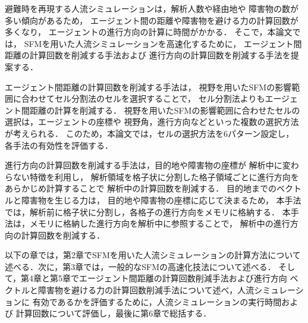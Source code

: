 避難時を再現する人流シミュレーションは，解析人数や経由地や
障害物の数が多い傾向があるため，
エージェント間の距離や障害物を避ける力の計算回数が多くなり，
エージェントの進行方向の計算に時間がかかる．
そこで，本論文では，
SFMを用いた人流シミュレーションを高速化するために，
エージェント間距離の計算回数を削減する手法および
進行方向の計算回数を削減する手法を提案する．

エージェント間距離の計算回数を削減する手法は，
視野を用いたSFMの影響範囲に合わせてセル分割法のセルを選択することで，
セル分割法よりもエージェント間距離の計算を削減する．
視野を用いたSFMの影響範囲に合わせたセルの選択は，エージェントの座標や
視野角，進行方向などといった複数の選択方法が考えられる．
このため，本論文では，セルの選択方法を6パターン設定し，
各手法の有効性を評価する．

進行方向の計算回数を削減する手法は，目的地や障害物の座標が
解析中に変わらない特徴を利用し，
解析領域を格子状に分割した格子領域ごとに進行方向をあらかじめ計算することで
解析中の計算回数を削減する．
目的地までのベクトルと障害物を生じる力は，
目的地や障害物の座標に応じて決まるため，
本手法では，解析前に格子状に分割し，各格子の進行方向をメモリに格納する．
本手法は，メモリに格納した進行方向を解析中に参照することで，
解析中の進行方向の計算回数を削減する．

以下の章では，第2章でSFMを用いた人流シミュレーションの計算方法について
述べる．次に，第3章では，一般的なSFMの高速化技法について述べる．
そして，第4章と第5章でエージェント間距離の計算回数削減手法および進行方向
ベクトルと障害物を避ける力の計算回数削減手法について述べ，人流シミュレーションに
有効であるかを評価するために，人流シミュレーションの実行時間および
計算回数について評価し，最後に第6章で総括する．


\clearpage
